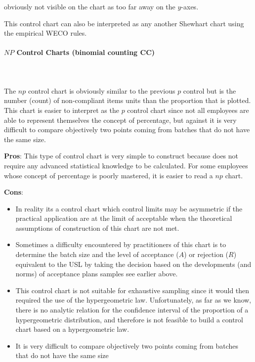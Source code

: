 	obviously not visible on the chart as too far away on the $y$-axes.

	This control chart can also be interpreted as any another Shewhart chart using the empirical WECO rules.
	
	\paragraph{$NP$ Control Charts (binomial counting CC)}\mbox{}\\\\
	The $np$ control chart is obviously similar to the previous $p$ control but is the number (count) of non-compliant items units than the proportion that is plotted. This chart is easier to interpret as the $p$ control chart since not all employees are able to represent themselves the concept of percentage, but against it is very difficult to compare objectively two points coming from batches that do not have the same size.
	
	\textbf{Pros}: This type of control chart is very simple to construct because does not require any advanced statistical knowledge to be calculated. For some employees whose concept of percentage is poorly mastered, it is easier to read a $np$ chart.

	\textbf{Cons}: 
	\begin{itemize}
		\item In reality its a control chart which control limits may be asymmetric if the practical application are at the limit of acceptable when the theoretical assumptions of construction of this chart are not met. 
		
		\item Sometimes a difficulty encountered by practitioners of this chart is to determine the batch size and the level of acceptance ($A$) or rejection ($R$) equivalent to the USL by taking the decision based on the developments (and norms) of acceptance plans samples see earlier above. 
		
		 \item This control chart is not suitable for exhaustive sampling since it would then required the use of the hypergeometric law. Unfortunately, as far as we know, there is no analytic relation for the confidence interval of the proportion of a hypergeometric distribution, and therefore is not feasible to build a control chart  based on a hypergeometric law.
		
		\item It is very difficult to compare objectively two points coming from batches that do not have the same size
	\end{itemize}
	
